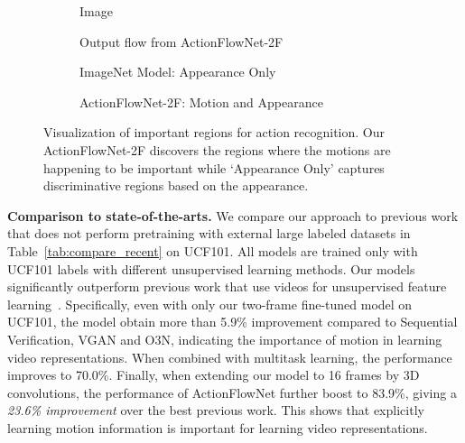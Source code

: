 \documentclass[10pt,twocolumn,letterpaper]{article}
\begin{document}
\begin{figure*}[h!]
\begin{center}
  \begin{subfigure}[ht]{0.18\linewidth}
      \caption{Image}
  \end{subfigure}
  \begin{subfigure}[ht]{0.18\linewidth}
      \caption{Output flow from ActionFlowNet-2F}
  \end{subfigure}
  \begin{subfigure}[ht]{0.18\linewidth}
      \caption{ImageNet Model: Appearance Only}
  \end{subfigure}
  \begin{subfigure}[ht]{0.18\linewidth}
      \caption{ActionFlowNet-2F: Motion and Appearance}
  \end{subfigure}
  \vspace{-1em}
  \caption{Visualization of important regions for action recognition. Our ActionFlowNet-2F discovers the regions where the motions are happening to be important while `Appearance Only' captures discriminative regions based on the appearance.}
  \label{fig:qual}
  \vspace{-2em}
\end{center}
\end{figure*}\textbf{Comparison to state-of-the-arts.}
We compare our approach to previous work that does not perform pretraining with external large labeled datasets in Table~\ref{tab:compare_recent} on UCF101.
All models are trained only with UCF101 labels with different unsupervised learning methods.
Our models significantly outperform previous work that use videos for unsupervised feature learning~\cite{misra2016shuffle, vondrick2016generating, fernando2016self, lee2017unsupervised}.
Specifically, even with only our two-frame fine-tuned model on UCF101, the model obtain more than 5.9\% improvement compared to Sequential Verification, VGAN and O3N, indicating the importance of motion in learning video representations.
When combined with multitask learning, the performance improves to 70.0\%. Finally, when extending our model to 16 frames by 3D convolutions, the performance of ActionFlowNet further boost to 83.9\%, giving a \emph{23.6\% improvement} over the best previous work.
This shows that explicitly learning motion information is important for learning video representations.
\end{document}
